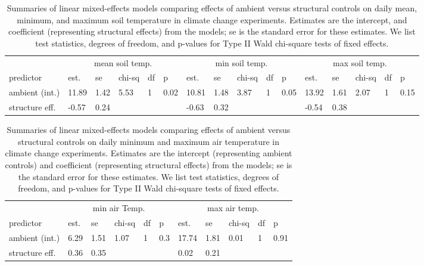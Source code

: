 \documentclass{article}
\begin{document}
\begin{table}[ht]
\centering
\caption{Summaries of linear mixed-effects models comparing effects of ambient versus structural controls on daily mean, minimum, and maximum soil temperature in climate change experiments. Estimates are the intercept, and coefficient (representing structural effects) from the models; se is the standard error for these estimates. We list test statistics, degrees of freedom, and p-values for Type II Wald chi-square tests of fixed effects.} 
\label{table:shamamb_soiltemp}
\begin{tabular}{|p{}|p{}p{}p{}p{}p{}|p{}p{}p{}p{}p{}|p{}p{}p{}p{}p{}|}
  \hline
  &\multicolumn{5}{c}{mean soil temp.} &\multicolumn{5}{c}{min soil temp.} &\multicolumn{5}{c}{max soil temp.}\\
 predictor & est. & se & chi-sq & df & p & est. & se & chi-sq & df & p & est. & se & chi-sq & df & p\\
 \hline
ambient (int.) & 11.89 & 1.42 & 5.53 & 1 & 0.02 & 10.81 & 1.48 & 3.87 & 1 & 0.05 & 13.92 & 1.61 & 2.07 & 1 & 0.15 \\ 
  structure eff. & -0.57 & 0.24 &  &  &  & -0.63 & 0.32 &  &  &  & -0.54 & 0.38 &  &  &  \\ 
   \hline
\end{tabular}
\end{table}
\begin{table}[ht]
\centering
\caption{Summaries of linear mixed-effects models comparing effects of ambient versus structural controls on daily minimum and maximum air temperature in climate change experiments. Estimates are the intercept (representing ambient controls) and coefficient (representing structural effects) from the models; se is the standard error for these estimates. We list test statistics, degrees of freedom, and p-values for Type II Wald chi-square tests of fixed effects.} 
\label{table:shamamb_airtemp}
\begin{tabular}{|p{}|p{}p{}p{}p{}p{}|p{}p{}p{}p{}p{}|}
  \hline
  &\multicolumn{5}{c}{min air Temp.} &\multicolumn{5}{c}{max air temp.}\\
 predictor & est. & se & chi-sq & df & p & est. & se & chi-sq & df & p\\
 \hline
ambient (int.) & 6.29 & 1.51 & 1.07 & 1 & 0.3 & 17.74 & 1.81 & 0.01 & 1 & 0.91 \\ 
  structure eff. & 0.36 & 0.35 &  &  &  & 0.02 & 0.21 &  &  &  \\ 
   \hline
\end{tabular}
\end{table}
\end{document}
